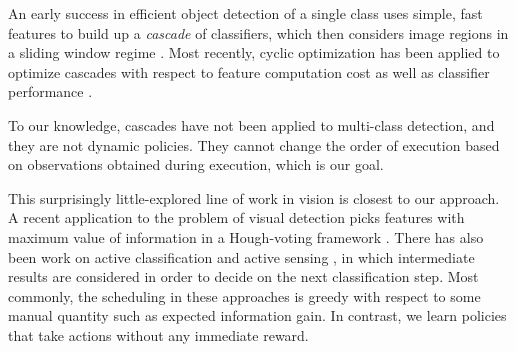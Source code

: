 An early success in efficient object detection of a single class uses simple, fast features to build up a \emph{cascade} of classifiers, which then considers image regions in a sliding window regime \cite{Viola2001}.
Most recently, cyclic optimization has been applied to optimize cascades with respect to feature computation cost as well as classifier performance \cite{Chen2012}.

To our knowledge, cascades have not been applied to multi-class detection,  and they are not dynamic policies.
They cannot change the order of execution based on observations obtained during execution, which is our goal.

This surprisingly little-explored line of work in vision is closest to our approach.
A recent application to the problem of visual detection picks features with maximum value of information in a Hough-voting framework \cite{Vijayanarasimhan2010}. 
There has also been work on active classification \cite{Gao2011} and active sensing \cite{Yu2009}, in which intermediate results are considered in order to decide on the next classification step.
Most commonly, the scheduling in these approaches is greedy with respect to some manual quantity such as expected information gain.
In contrast, we learn policies that take actions without any immediate reward.
